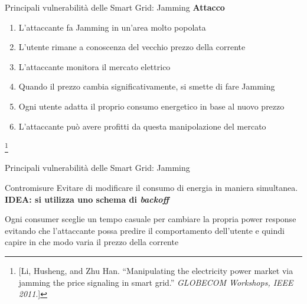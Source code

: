 \begin{frame}{Principali vulnerabilità delle Smart Grid: Jamming}
	\textbf{Attacco}\\
	\begin{enumerate}[<+- | alert@+>]
		\item L'attaccante fa Jamming in un'area molto popolata
		\item L'utente rimane a conoscenza del vecchio prezzo della corrente
		\item L'attaccante monitora il mercato elettrico
		\item Quando il prezzo cambia significativamente, si smette di fare Jamming
		\item Ogni utente adatta il proprio consumo energetico in base al nuovo prezzo
		\item L'attaccante può avere profitti da questa manipolazione del mercato
	\end{enumerate}
	\let\thefootnote\relax\footnote{\small [Li, Husheng, and Zhu Han. ``Manipulating the electricity power market via jamming the price signaling in smart grid.'' \emph{GLOBECOM Workshops, IEEE 2011}.]}
\end{frame}

\begin{frame}{Principali vulnerabilità delle Smart Grid: Jamming}
	\begin{block}{Contromisure}
		Evitare di modificare il consumo di energia in maniera simultanea.\newline
		\textbf{\color{blue_slides}IDEA: si utilizza uno schema di \emph{backoff}} 
	\end{block}
	\pause
	\begin{block}{}
	Ogni consumer sceglie un tempo casuale per cambiare la propria power response evitando che l'attaccante possa predire il comportamento dell'utente e quindi capire in che modo varia il prezzo della corrente
	\end{block}
\end{frame}